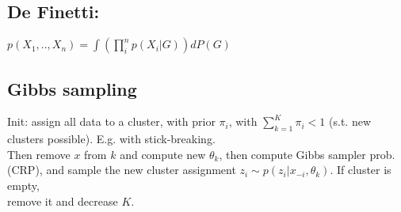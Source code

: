 \subsection*{De Finetti:}$p(X_1,..,X_n)=\int (\prod_i^np(X_i|G))dP(G)$

\subsection*{Gibbs sampling}
Init: assign all data to a cluster, with prior $\pi_i$, with $\sum_{k=1}^K\pi_i<1$ (s.t. new clusters possible). E.g. with stick-breaking. \\
Then remove $x$ from $k$ and compute new $\theta_k$, then compute Gibbs sampler prob. (CRP), and sample the new cluster assignment $z_i\sim p(z_i|x_{-i},\theta_k)$. If cluster is empty, \\
remove it and decrease $K$.